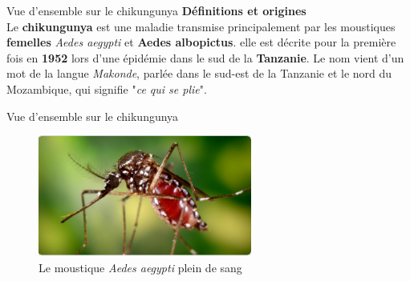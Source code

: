 \documentclass[aspectratio=169,xcolor=dvipsnames, t]{beamer}
\begin{document}
	\begin{frame}{Vue d'ensemble sur le chikungunya}
		\justifying
		\textbf{\large{Définitions et origines}}\\[0.2cm]
		\qquad Le \textbf{chikungunya} est une maladie transmise principalement par les moustiques \textbf{femelles} \textit{Aedes aegypti} et \textbf{Aedes albopictus}.
		elle est décrite pour la première fois en \textbf{1952} lors d'une épidémie dans le sud de la \textbf{Tanzanie}. Le nom vient d'un mot de la langue \textit{Makonde}, parlée dans le sud-est de la Tanzanie et le nord du Mozambique, qui signifie "\textit{ce qui se plie}".\\[0.2cm]
	\end{frame}
	\begin{frame}{Vue d'ensemble sur le chikungunya}
			\begin{figure}[!h]
				\begin{center}
					\includegraphics[width=7cm]{figures/moustique}
				\end{center}
				\caption{Le moustique \textit{Aedes aegypti }plein de sang~\cite{p3}}
			\end{figure} 
	\end{frame}
\end{document}
